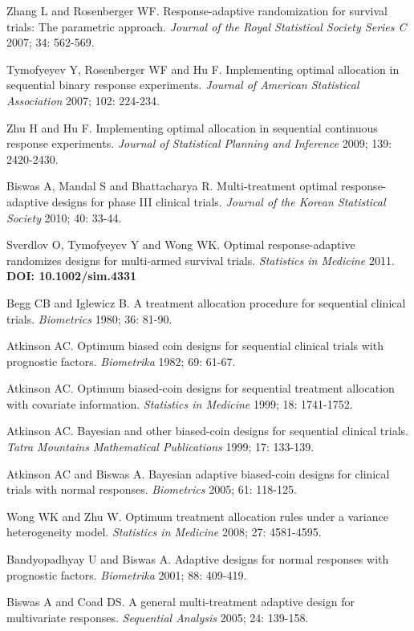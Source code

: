 \begin{thebibliography}
 Zhang L and Rosenberger WF.  Response-adaptive randomization for survival trials: The parametric approach. \textit{Journal of the Royal Statistical Society Series C} 2007; 34: 562-569.

 Tymofyeyev Y, Rosenberger WF and Hu F.  Implementing optimal allocation in sequential binary response experiments. \textit{Journal of American Statistical Association} 2007; 102: 224-234.

  Zhu H and Hu F.  Implementing optimal allocation in sequential continuous response experiments. \textit{ Journal of  Statistical Planning and  Inference } 2009; 139: 2420-2430.

 Biswas A, Mandal S and Bhattacharya R. Multi-treatment optimal response-adaptive designs for phase III clinical trials. \textit{Journal of the Korean Statistical Society} 2010; 40: 33-44.

 Sverdlov O, Tymofyeyev Y and Wong WK. Optimal response-adaptive randomizes designs for multi-armed survival trials.  \textit{Statistics in Medicine} 2011. \textbf{DOI: 10.1002/sim.4331}

 Begg CB and Iglewicz B. A treatment allocation
procedure for sequential clinical trials. \textit{Biometrics} 1980; 36: 81-90.

 Atkinson AC. Optimum biased coin designs for sequential clinical trials with prognostic factors. \textit{Biometrika} 1982; 69: 61-67.

 Atkinson AC.  Optimum biased-coin designs for sequential treatment allocation with covariate information. \textit{Statistics in Medicine}  1999; 18: 1741-1752.

 Atkinson AC. Bayesian and other biased-coin designs for sequential clinical trials. \textit{Tatra Mountains Mathematical Publications}  1999; 17: 133-139.

 Atkinson AC and Biswas A. Bayesian adaptive biased-coin designs for clinical trials with normal responses. \textit{Biometrics}  2005; 61:  118-125.

 Wong WK and Zhu W. Optimum treatment allocation rules under a variance heterogeneity model. \textit{Statistics in Medicine}  2008; 27: 4581-4595.

  Bandyopadhyay U and Biswas A. Adaptive designs for normal responses with prognostic factors. \textit{Biometrika} 2001; 88:
409-419.

 Biswas A and Coad DS. A general multi-treatment adaptive design for multivariate responses.  \textit{Sequential Analysis} 2005; 24: 139-158.
 

\end{thebibliography}
